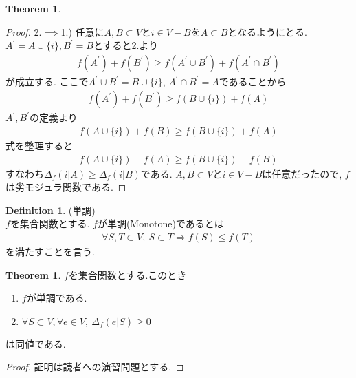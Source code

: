 \documentclass[11pt, a4paper, dvipdfmx]{jsbook}
\theoremstyle{definition}
\newtheorem{Definition+}[Axiom+]{Definition}
\newtheorem{Theorem+}[Axiom+]{Theorem}
\begin{document}
\begin{Theorem+}
\begin{proof}
      2.$\implies$1.) 任意に$A, B\subset V$と$i\in V - B$を$A\subset B$となるようにとる. $A^{'} = A\cup \{i\}, B^{'} = B$とすると2.より
      \begin{align*}
          f(A^{'}) + f(B^{'})\geq f(A^{'}\cup B^{'}) + f(A^{'}\cap B^{'})
      \end{align*}
      が成立する. ここで$A^{'}\cup B^{'} = B\cup\{i\}$, $A^{'}\cap B^{'} = A$であることから
      \begin{align*}
          f(A^{'}) + f(B^{'})\geq f(B\cup\{i\}) + f(A)
      \end{align*}
      $A^{'}, B^{'}$の定義より
      \begin{align*}
          f(A\cup \{i\}) + f(B)\geq f(B\cup\{i\}) + f(A)
      \end{align*}
      式を整理すると
      \begin{align*}
          f(A\cup \{i\}) - f(A)\geq f(B\cup\{i\}) - f(B)
      \end{align*}
      すなわち$\Delta_{f}(i | A)\geq\Delta_{f}(i | B)$である. $A, B\subset V$と$i\in V - B$は任意だったので, 
      $f$は劣モジュラ関数である.
  \end{proof}
\end{Theorem+}
\begin{Definition+}(単調)\\
  $f$を集合関数とする. $f$が単調(Monotone)であるとは
  \begin{align*}
      \forall S, T\subset V,~ S\subset T\Longrightarrow f(S)\leq f(T)
  \end{align*}
  を満たすことを言う.
\end{Definition+}
\begin{Theorem+}
  $f$を集合関数とする.このとき
  \begin{enumerate}
      \item $f$が単調である.
      \item $\forall S\subset V, \forall e\in V,~ \Delta_{f}(e | S)\geq 0$
  \end{enumerate}
  は同値である.
  \begin{proof}
      証明は読者への演習問題とする.
  \end{proof}
\end{Theorem+}
\end{document}
